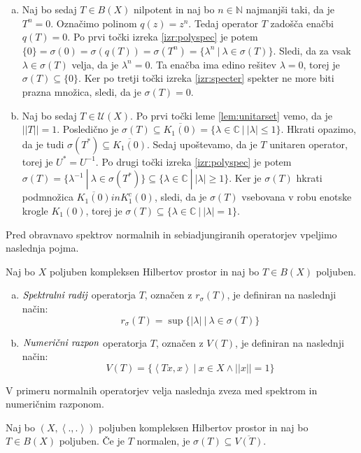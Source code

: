 \documentclass[mat2]{matdelo}
\newcommand{\N}{\mathbb{N}}
\newcommand{\C}{\mathbb{C}}
\newcommand{\abs}[1]{\ensuremath{\lvert #1 \rvert}}
\newcommand{\norm}[1]{\abs{\abs{#1}}}
\newcommand{\pojem}[1]{\ensuremath{\emph{#1}}}
\newcommand{\Sp}[2]{\ensuremath{\left<#1, #2\right>}}
\begin{document}
\begin{dokaz}
\begin{enumerate}[a)]
				\item Naj bo sedaj $T\in B(X)$ nilpotent in naj bo $n\in\N$ najmanjši taki, da je $T^n = 0$. Označimo polinom $q(z)=z^n$. Tedaj operator $T$ zadošča enačbi $q(T) = 0$. Po prvi točki izreka \ref{izr:polyspec} je potem $\{0\}=\sigma(0)=\sigma(q(T))=\sigma(T^n)=\{\lambda^n~|~\lambda\in\sigma(T)\}$. Sledi, da za vsak $\lambda\in\sigma(T)$ velja, da je $\lambda^n = 0$. Ta enačba ima edino rešitev $\lambda=0$, torej je $\sigma(T)\subseteq\{0\}$. Ker po tretji točki izreka \ref{izr:specter} spekter ne more biti prazna množica, sledi, da je $\sigma(T)=0$.
				\item Naj bo sedaj $T\in \mathcal{U}(X)$. Po prvi točki leme \ref{lem:unitarset} vemo, da je $\norm{T}=1$. Posledično je $\sigma(T)\subseteq \overline{K_1(0)} = \{\lambda\in\C~|~\abs{\lambda}\leq 1\}$. Hkrati opazimo, da je tudi $\sigma(T^*) \subseteq \overline{K_1(0)}$. Sedaj upoštevamo, da je $T$ unitaren operator, torej je $U^* = U^{-1}$. Po drugi točki izreka \ref{izr:polyspec} je potem $\sigma(T) =
				\{\lambda^{-1}~|~\lambda\in\sigma(T^*)\}\subseteq \{\lambda\in\C~|~\abs{\lambda}\geq 1\}$. Ker je $\sigma(T)$ hkrati podmnožica $\overline{K_1(0)} in K_1^c(0)$, sledi, da je $\sigma(T)$ vsebovana v robu enotske krogle $K_1(0)$, torej je $\sigma(T)\subseteq\{\lambda\in\C~|~\abs{\lambda}=1\}$.
			\end{enumerate}
		\end{dokaz}
		
		Pred obravnavo spektrov normalnih in sebiadjungiranih operatorjev vpeljimo naslednja pojma.
		
		\begin{definicija}
			\label{def:specrad}
			Naj bo $X$ poljuben kompleksen Hilbertov prostor in naj bo $T\in B(X)$ poljuben. \begin{enumerate}[a)]
				\item \pojem{Spektralni radij} operatorja $T$, označen z $r_\sigma(T)$, je definiran na naslednji način: $$r_\sigma(T) = \sup\{\abs{\lambda}~|~\lambda\in\sigma(T)\}$$
				\item \pojem{Numerični razpon} operatorja $T$, označen z $V(T)$, je definiran na naslednji način: $$V(T)=\{\Sp{Tx}{x}~|~x\in X \land \norm{x}=1\}$$
			\end{enumerate}
		\end{definicija}
		
		V primeru normalnih operatorjev velja naslednja zveza med spektrom in numeričnim razponom.
		
		\begin{lema}
			\label{lem:normalnumrazspec}
			Naj bo $(X, \Sp{.}{.})$ poljuben kompleksen Hilbertov prostor in naj bo $T\in B(X)$ poljuben. Če je $T$ normalen, je $\sigma(T)\subseteq \overline{V(T)}$.
		\end{lema}
		
\end{document}
